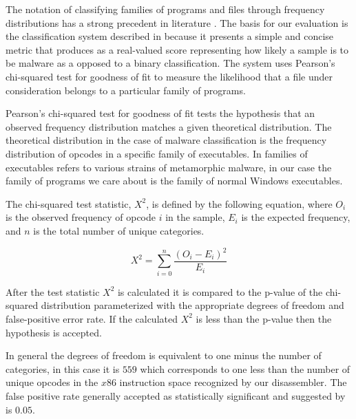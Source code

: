     The notation of classifying families of programs and files through frequency
    distributions has a strong precedent in literature
    \cite{chisquared,hmm_evade,stat_model,fileprints}. The basis for our
    evaluation is the classification system described in \cite{chisquared}
    because it presents a simple and concise metric that produces as a
    real-valued score representing how likely a sample is to be malware as a
    opposed to a binary classification. The system uses Pearson's chi-squared
    test for goodness of fit to measure the likelihood that a file under
    consideration belongs to a particular family of programs.

    Pearson's chi-squared test for goodness of fit tests the hypothesis that
    an observed frequency distribution matches a given theoretical
    distribution. The theoretical distribution in the case of malware
    classification is the frequency distribution of opcodes in a specific
    family of executables. In \cite{chisquared} families of executables
    refers to various strains of metamorphic malware, in our case the family
    of programs we care about is the family of normal Windows executables.
    

    The chi-squared test statistic, $X^2$, is defined by the following
    equation, where $O_i$ is the observed frequency of opcode $i$ in the
    sample, $E_i$ is the expected frequency, and $n$ is the total number of
    unique categories.

    $$X^2 = \sum_{i=0}^{n} \frac{(O_i - E_i)^2}{E_i}$$

    After the test statistic $X^2$ is calculated it is compared to the
    p-value of the chi-squared distribution parameterized with the
    appropriate degrees of freedom and false-positive error rate. If the
    calculated $X^2$ is less than the p-value then the hypothesis is
    accepted.

    In general the degrees of freedom is equivalent to one minus the number of
    categories, in this case it is $559$ which corresponds to one less than the
    number of unique opcodes in the $x86$ instruction space recognized by our
    disassembler. The false positive rate generally accepted as statistically
    significant and suggested by \cite{chisquared} is $0.05$.

